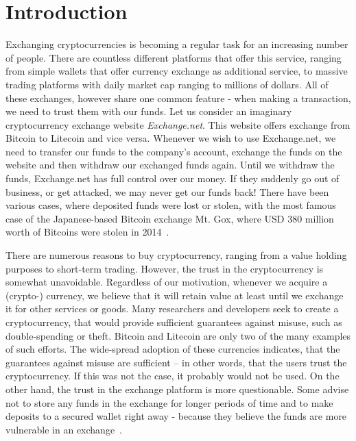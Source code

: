 \section{Introduction}
% 
Exchanging cryptocurrencies is becoming a regular task for an increasing number of people. There are countless different platforms that offer this service, ranging from simple wallets that offer currency exchange as additional service, to massive trading platforms with daily market cap ranging to millions of dollars. All of these exchanges, however share one common feature - when making a transaction, we need to trust them with our funds. Let us consider an imaginary cryptocurrency exchange website \textit{Exchange.net}. This website offers exchange from Bitcoin to Litecoin and vice versa. Whenever we wish to use Exchange.net, we need to transfer our funds to the company's account, exchange the funds on the website and then withdraw our exchanged funds again. Until we withdraw the funds, Exchange.net has full control over our money. If they suddenly go out of business, or get attacked, we may never get our funds back! There have been various cases, where deposited funds were lost or stolen, with the most famous case of the Japanese-based Bitcoin exchange Mt. Gox, where USD 380 million worth of Bitcoins were stolen in 2014~\cite{Popper2014ApparentTimes}.

There are numerous reasons to buy cryptocurrency, ranging from a value holding purposes to short-term trading. However, the trust in the cryptocurrency is somewhat unavoidable. Regardless of our motivation, whenever we acquire a (crypto-) currency, we believe that it will retain value at least until we exchange it for other services or goods. Many researchers and developers seek to create a cryptocurrency, that would provide sufficient guarantees against misuse, such as double-spending or theft. Bitcoin and Litecoin are only two of the many examples of such efforts. The wide-spread adoption of these currencies indicates, that the guarantees against misuse are sufficient -- in other words, that the users trust the cryptocurrency. If this was not the case, it probably would not be used. On the other hand, the trust in the exchange platform is more questionable. Some advise not to store any funds in the exchange for longer periods of time and to make deposits to a secured wallet right away - because they believe the funds are more vulnerable in an exchange~\cite{McIntosh2018HowScams}.

